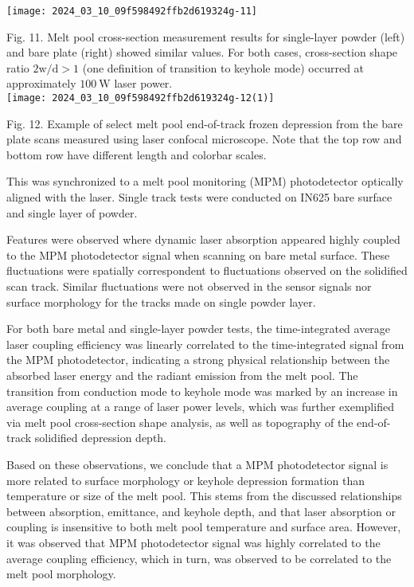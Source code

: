 \documentclass[10pt]{article}
\begin{document}
\begin{center}
\texttt{[image: 2024\_03\_10\_09f598492ffb2d619324g-11]}
\end{center}

Fig. 11. Melt pool cross-section measurement results for single-layer powder (left) and bare plate (right) showed similar values. For both cases, cross-section shape ratio $2 \mathrm{w} / \mathrm{d}>1$ (one definition of transition to keyhole mode) occurred at approximately $100 \mathrm{~W}$ laser power.\\
\texttt{[image: 2024\_03\_10\_09f598492ffb2d619324g-12(1)]}

Fig. 12. Example of select melt pool end-of-track frozen depression from the bare plate scans measured using laser confocal microscope. Note that the top row and bottom row have different length and colorbar scales.

This was synchronized to a melt pool monitoring (MPM) photodetector optically aligned with the laser. Single track tests were conducted on IN625 bare surface and single layer of powder.

Features were observed where dynamic laser absorption appeared highly coupled to the MPM photodetector signal when scanning on bare metal surface. These fluctuations were spatially correspondent to fluctuations observed on the solidified scan track. Similar fluctuations were not observed in the sensor signals nor surface morphology for the tracks made on single powder layer.

For both bare metal and single-layer powder tests, the time-integrated average laser coupling efficiency was linearly correlated to the time-integrated signal from the MPM photodetector, indicating a strong physical relationship between the absorbed laser energy and the radiant emission from the melt pool. The transition from conduction mode to keyhole mode was marked by an increase in average coupling at a range of laser power levels, which was further exemplified via melt pool cross-section shape analysis, as well as topography of the end-of-track solidified depression depth.

Based on these observations, we conclude that a MPM photodetector signal is more related to surface morphology or keyhole depression formation than temperature or size of the melt pool. This stems from the discussed relationships between absorption, emittance, and keyhole depth, and that laser absorption or coupling is insensitive to both melt pool temperature and surface area. However, it was observed that MPM photodetector signal was highly correlated to the average coupling efficiency, which in turn, was observed to be correlated to the melt pool morphology.
\end{document}

